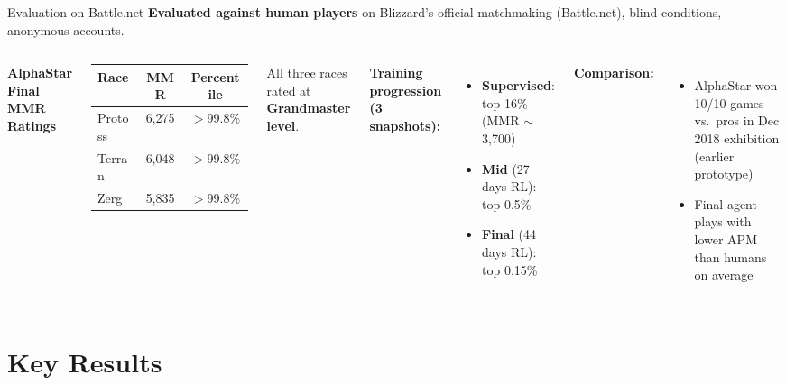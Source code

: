 \documentclass[aspectratio=169]{beamer}
\begin{document}
\begin{frame}{Evaluation on Battle.net}
\textbf{Evaluated against human players} on Blizzard's official matchmaking (Battle.net), blind conditions, anonymous accounts.

\vspace{0.5em}
\begin{columns}[T]
\centering
\textbf{AlphaStar Final MMR Ratings}\\[0.5em]
\begin{tabular}{lcc}
\toprule
\textbf{Race} & \textbf{MMR} & \textbf{Percentile} \\
\midrule
Protoss & 6,275 & $>$99.8\% \\
Terran  & 6,048 & $>$99.8\% \\
Zerg    & 5,835 & $>$99.8\% \\
\bottomrule
\end{tabular}

\vspace{0.5em}
All three races rated at \textbf{Grandmaster level}.

\textbf{Training progression (3 snapshots):}
\begin{itemize}
    \item \textbf{Supervised}: top 16\% (MMR $\sim$3,700)
    \item \textbf{Mid} (27 days RL): top 0.5\%
    \item \textbf{Final} (44 days RL): top 0.15\%
\end{itemize}

\vspace{0.3em}
\textbf{Comparison:}
\begin{itemize}
    \item AlphaStar won 10/10 games vs.\ pros in Dec 2018 exhibition (earlier prototype)
    \item Final agent plays with lower APM than humans on average
\end{itemize}
\end{columns}
\end{frame}

\section{Key Results}
\end{document}
